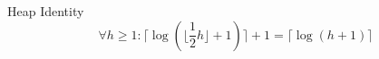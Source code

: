 
\begin{frame}{}
  \begin{exampleblock}{Heap Identity}
    \[
      \forall h \ge 1: \lceil \log(\lfloor \frac{1}{2}h \rfloor + 1)\rceil + 1 = \lceil \log (h+1) \rceil
    \]
  \end{exampleblock}
\end{frame}



